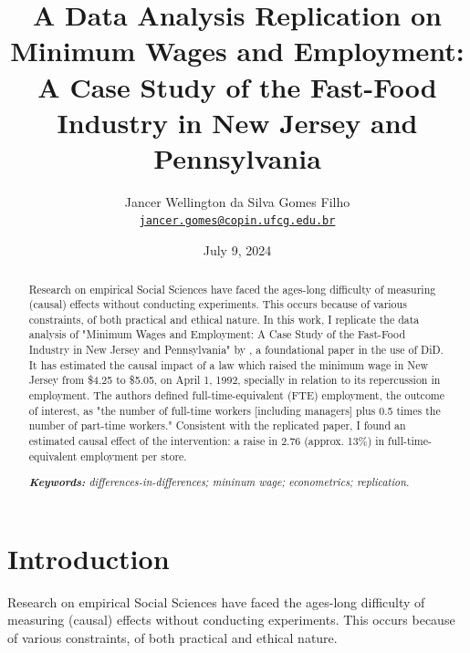 \documentclass[11pt]{article}
\title{A Data Analysis Replication on Minimum Wages and Employment: A Case Study of the Fast-Food Industry in New Jersey and Pennsylvania
}
\author{Jancer Wellington da Silva Gomes Filho\\%
    \href{mailto:jancer.gomes@copin.ufcg.edu.br}{\texttt{jancer.gomes@copin.ufcg.edu.br}} %
    }
\date{July 9, 2024}
\begin{document}
{
\maketitle
\begin{abstract}

Research on empirical Social Sciences have faced the ages-long difficulty of measuring (causal) effects without conducting experiments.
This occurs because of various constraints, of both practical and ethical nature. In this work, I replicate the data analysis of "Minimum Wages and Employment: A Case Study of the Fast-Food Industry in New Jersey and Pennsylvania" by \citet{RePEc:aea:aecrev:v:84:y:1994:i:4:p:772-93}, a foundational paper in the use of DiD. It has estimated the causal impact of a law which raised the minimum wage in New Jersey from \$4.25 to \$5.05, on April 1, 1992, specially in relation to its repercussion in employment. The authors defined full-time-equivalent (FTE) employment, the outcome of interest, as "the number of full-time workers [including managers] plus 0.5 times the number of part-time workers." Consistent with the replicated paper, I found an estimated causal effect of the intervention: a raise in 2.76 (approx. 13\%) in full-time-equivalent employment per store.


\noindent
\textit{\textbf{Keywords: }%
differences-in-differences; mininum wage; econometrics; replication.} \\ %

\end{abstract}
}


\section{Introduction}
Research on empirical Social Sciences have faced the ages-long difficulty of measuring (causal) effects without conducting experiments.
This occurs because of various constraints, of both practical and ethical nature.
\end{document}
